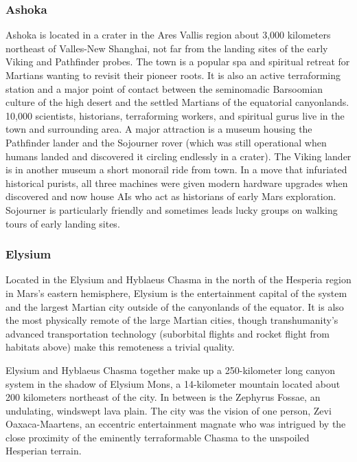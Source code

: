 \subsubsection{Ashoka}

Ashoka is located in a crater in the Ares Vallis region 
about 3,000 kilometers northeast of Valles-New 
Shanghai, not far from the landing sites of the early 
Viking and Pathfinder probes. The town is a popular 
spa and spiritual retreat for Martians wanting to revisit their pioneer roots. It is also an active terraforming 
station and a major point of contact between the seminomadic Barsoomian culture of the high desert and 
the settled Martians of the equatorial canyonlands. 
10,000 scientists, historians, terraforming workers, 
and spiritual gurus live in the town and surrounding 
area. A major attraction is a museum housing the 
Pathfinder lander and the Sojourner rover (which was 
still operational when humans landed and discovered 
it circling endlessly in a crater). The Viking lander is in 
another museum a short monorail ride from town. In 
a move that infuriated historical purists, all three machines were given modern hardware upgrades when 
discovered and now house AIs who act as historians 
of early Mars exploration. Sojourner is particularly 
friendly and sometimes leads lucky groups on walking 
tours of early landing sites.

\subsubsection{Elysium}

Located in the Elysium and Hyblaeus Chasma in 
the north of the Hesperia region in Mars's eastern 
hemisphere, Elysium is the entertainment capital of 
the system and the largest Martian city outside of 
the canyonlands of the equator. It is also the most 
physically remote of the large Martian cities, though 
transhumanity's advanced transportation technology (suborbital flights and rocket flight from habitats 
above) make this remoteness a trivial quality.

Elysium and Hyblaeus Chasma together make up 
a 250-kilometer long canyon system in the shadow 
of Elysium Mons, a 14-kilometer mountain located 
about 200 kilometers northeast of the city. In between 
is the Zephyrus Fossae, an undulating, windswept 
lava plain. The city was the vision of one person, 
Zevi Oaxaca-Maartens, an eccentric entertainment 
magnate who was intrigued by the close proximity of 
the eminently terraformable Chasma to the unspoiled 
Hesperian terrain.

